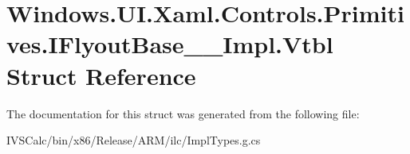 \hypertarget{struct_windows_1_1_u_i_1_1_xaml_1_1_controls_1_1_primitives_1_1_i_flyout_base_____impl_1_1_vtbl}{}\section{Windows.\+U\+I.\+Xaml.\+Controls.\+Primitives.\+I\+Flyout\+Base\+\_\+\+\_\+\+Impl.\+Vtbl Struct Reference}
\label{struct_windows_1_1_u_i_1_1_xaml_1_1_controls_1_1_primitives_1_1_i_flyout_base_____impl_1_1_vtbl}


The documentation for this struct was generated from the following file\+:\begin{DoxyCompactItemize}
\item 
I\+V\+S\+Calc/bin/x86/\+Release/\+A\+R\+M/ilc/Impl\+Types.\+g.\+cs\end{DoxyCompactItemize}
